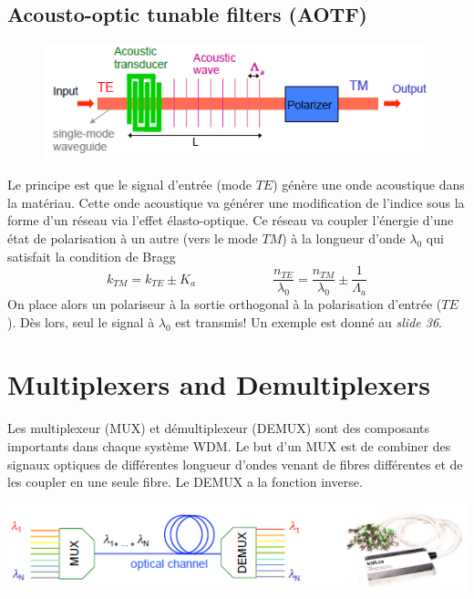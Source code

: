 \subsection{Acousto-optic tunable filters (AOTF)}
	\begin{figure}
	\includegraphics[scale=0.65]{ch3/image22}
	\end{figure}
Le principe est que le signal d'entrée (mode $TE$) génère une onde acoustique dans la matériau. Cette onde acoustique va générer une modification de l'indice sous la forme d'un réseau via l'effet
élasto-optique. Ce réseau va coupler l'énergie d'une état de polarisation à un autre (vers le 
mode $TM$) à la longueur d'onde $\lambda_0$ qui satisfait la condition de Bragg
\begin{equation}
{k_{TM}} = {k_{TE}} \pm {K_a}\qquad\qquad\qquad
\frac{{{n_{TE}}}}{{{\lambda _0}}} = \frac{{{n_{TM}}}}{{{\lambda _0}}} \pm \frac{1}{{{\Lambda _a}}}
\end{equation}
On place alors un polariseur à la sortie orthogonal à la polarisation d'entrée ($TE$). Dès lors, 
seul le signal à $\lambda_0$ est transmis! Un exemple est donné au \textit{slide 36}.




\section{Multiplexers and Demultiplexers}
Les multiplexeur (MUX) et démultiplexeur (DEMUX) sont des composants importants dans chaque système
WDM. Le but d'un MUX est de combiner des signaux optiques de différentes longueur d'ondes venant de
fibres différentes et de les coupler en une seule fibre. Le DEMUX a la fonction inverse. 

\begin{center}
	\includegraphics[scale=0.65]{ch3/image23}
\end{center}

